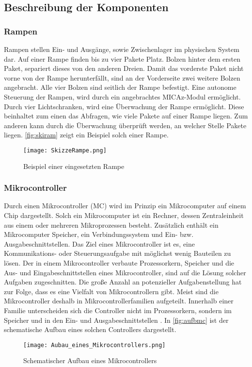 \subsection{Beschreibung der Komponenten}
\subsubsection{Rampen}
Rampen stellen Ein- und Ausgänge, sowie Zwischenlager im physischen System dar. Auf einer Rampe finden bis zu vier Pakete Platz. Bolzen hinter dem ersten Paket, separiert dieses von den anderen Dreien. Damit das vorderste Paket nicht vorne von der Rampe herunterfällt, sind an der Vorderseite zwei weitere Bolzen angebracht. Alle vier Bolzen sind seitlich der Rampe befestigt. Eine autonome Steuerung der Rampen, wird durch ein angebrachtes MICAz-Modul ermöglicht. Durch vier Lichtschranken, wird eine Überwachung der Rampe ermöglicht. Diese beinhaltet zum einen das Abfragen, wie viele Pakete auf einer Rampe liegen. Zum anderen kann durch die Überwachung überprüft werden, an welcher Stelle Pakete liegen. \autoref{fig:skiram} zeigt ein Beispiel solch einer Rampe.

\begin{figure}[h!]
	\centering
		\texttt{[image: SkizzeRampe.png]}
	\caption{Beispiel einer eingesetzten Rampe}
	\label{fig:skiram}
\end{figure}

\subsubsection{Mikrocontroller}
Durch einen Mikrocontroller (MC) wird im Prinzip ein Mikrocomputer auf einem Chip dargestellt. Solch ein Mikrocomputer ist ein Rechner, dessen Zentraleinheit aus einem oder mehreren Mikroprozessen besteht. Zusätzlich enthält ein Mikrocomputer Speicher, ein Verbindungssystem und Ein- bzw. Ausgabeschnittstellen. Das Ziel eines Mikrocontroller ist es, eine Kommunikations- oder Steuerungsaufgabe mit möglichst wenig Bauteilen zu lösen. Der in einem Mikrocontroller verbaute Prozessorkern, Speicher und die Aus- und Eingabeschnittstellen eines Mikrocontroller, sind auf die Lösung solcher Aufgaben zugeschnitten. Die große Anzahl an potenzieller Aufgabenstellung hat zur Folge, dass es eine Vielfalt von Mikrocontrollern gibt. Meist sind die Mikrocontroller deshalb in Mikrocontrollerfamilien aufgeteilt. Innerhalb einer Familie unterscheiden sich die Controller nicht im Prozessorkern, sondern im Speicher und in den Ein- und Ausgabeschnittstellen \cite{ECHT2005}. In \autoref{fig:aufbmc} ist der schematische Aufbau eines solchen Controllers dargestellt.
\begin{figure}[th]
	\centering
		\texttt{[image: Aubau\_eines\_Mikrocontrollers.png]}
	\caption{Schematischer Aufbau eines Mikrocontrollers \cite{habil:Ostermeye:2014:Online}}
	\label{fig:aufbmc}
\end{figure}

